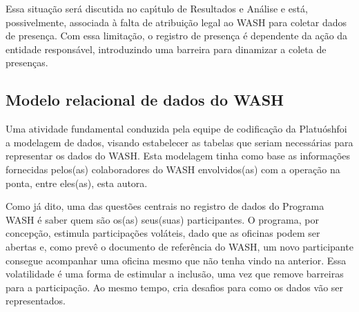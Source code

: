 \documentclass[
12pt,		%
openright,	%
twoside,  %
a4paper,			%
chapter=TITLE,		%
english,			%
french,				%
spanish,			%
brazil				%
]{USPSC-classe/USPSC}
\begin{document}
\noindent\begin{center}\mbox{\centering{}}\end{center}


Essa situa\c{c}\~ao ser\'a discutida no cap\'{\i}tulo de Resultados e An\'alise e est\'a, possivelmente, associada \`a falta de atribui\c{c}\~ao legal ao WASH para coletar dados de presen\c{c}a. Com essa limita\c{c}\~ao, o registro de presen\c{c}a \'e dependente da a\c{c}\~ao da entidade respons\'avel, introduzindo uma barreira para dinamizar a coleta de presen\c{c}as.










\subsection[Modelo relacional de dados do WASH]{Modelo relacional de dados do WASH}\label{Modelo relacional de dados do WASH}
Uma atividade fundamental conduzida pela equipe de codifica\c{c}\~ao da \textquotedbl Platu\'osh\textquotedbl  foi a modelagem de dados, visando estabelecer as tabelas que seriam necess\'arias para representar os dados do WASH. Esta modelagem tinha como base as informa\c{c}\~oes fornecidas pelos(as) colaboradores do WASH envolvidos(as) com a opera\c{c}\~ao na ponta, entre eles(as), esta autora.










Como j\'a dito, uma das quest\~oes centrais no registro de dados do Programa WASH \'e saber quem s\~ao os(as) seus(suas) participantes. O programa, por concep\c{c}\~ao, estimula participa\c{c}\~oes vol\'ateis, dado que as oficinas podem ser abertas e, como prev\^e o documento de refer\^encia do WASH, um novo participante consegue acompanhar uma oficina mesmo que n\~ao tenha vindo na anterior. Essa volatilidade \'e uma forma de estimular a inclus\~ao, uma vez que remove barreiras para a participa\c{c}\~ao. Ao mesmo tempo, cria desafios para como os dados v\~ao ser representados.
\end{document}

